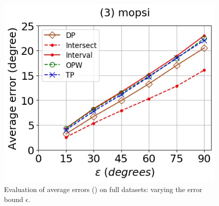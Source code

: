 \begin{figure}[tb!]
	\includegraphics[scale=0.3480]{Figures/Exp-DAD-error-epsilon-mopsi.jpg}	
	\vspace{-2ex}
	\caption{\small Evaluation of average errors (\dad) on full datasets: varying the error bound $\epsilon$.}
	\label{fig:ae-dad-epsilon}
	\vspace{-2ex}
\end{figure}





